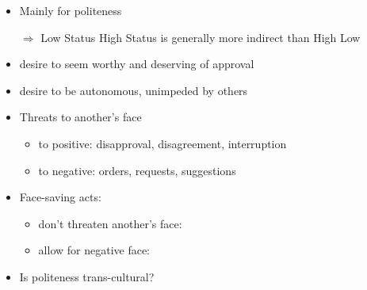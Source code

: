 \documentclass[headrule,footrule]{foils}
\begin{document}

\begin{itemize}
\item Mainly for politeness

  \begin{exe}
    \begin{xlist}
      \ex {}
    \end{xlist}
    \begin{xlist}
      \ex {}
    \end{xlist}
    \begin{xlist}
      \ex {}
    \end{xlist}
  \end{exe}
\item[$\Rightarrow$] Low Status \into High Status is generally more indirect than High \into Low 
\end{itemize}

\begin{itemize}
\item {} desire to seem worthy and deserving of approval
\item {} desire to be autonomous, unimpeded by others
\item Threats to another’s face
  \begin{itemize}
  \item to positive: disapproval, disagreement, interruption
  \item to negative: orders, requests, suggestions
  \end{itemize}
\item Face-saving acts: 
  \begin{itemize}
  \item don't threaten another’s face: 
  \item allow for negative face: 
  \end{itemize}
\item Is politeness trans-cultural?
\end{itemize}

\end{document}
